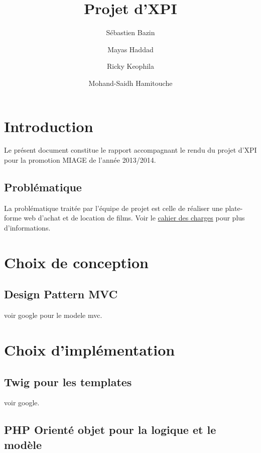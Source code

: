 \documentclass[a4paper,10pt]{report}
\begin{document}
\pagestyle{plain} %


\title{Projet d'XPI}
\author{Sébastien Bazin
\and Mayas Haddad
\and Ricky Keophila
\and Mohand-Saidh Hamitouche}
\maketitle
\tableofcontents

\chapter{Introduction}
Le présent document constitue le rapport accompagnant le rendu du projet d'XPI pour la promotion MIAGE de l'année 2013/2014.

\section{Problématique}
La problématique traitée par l'équipe de projet est celle de réaliser une plate-forme web d'achat et de location de films.
Voir le \href{https://www.lri.fr/~kn/files/projet_xpi_2013.pdf}{cahier des charges} pour plus d'informations.

\chapter{Choix de conception}

\section{Design Pattern MVC}

voir google pour le modele mvc.

\chapter{Choix d'implémentation}

\section{Twig pour les templates }
 
voir google.

\section{PHP Orienté objet pour la logique et le modèle}
\end{document}
